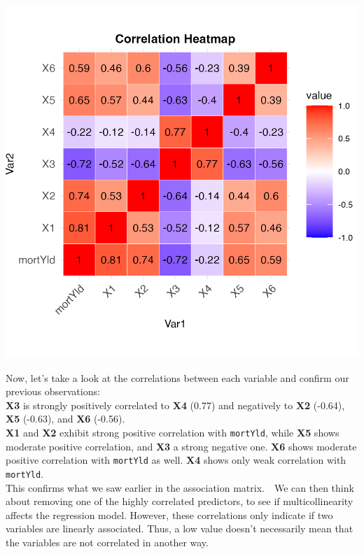 \documentclass[
  11pt,
]{article}
\begin{document}
\begin{minipage}{0.4\textwidth}
\includegraphics[width=\linewidth]{correlation_heatmap.png}
\end{minipage}
\hfill
\begin{minipage}{0.6\textwidth}
\vspace{0.5em}
\small
Now, let's take a look at the correlations between each variable and confirm our previous observations: \\
\textbf{X3} is strongly positively correlated to \textbf{X4} (0.77) and negatively to \textbf{X2} (-0.64), \textbf{X5} (-0.63), and \textbf{X6} (-0.56).\\
\textbf{X1} and \textbf{X2} exhibit strong positive correlation with \texttt{mortYld}, while \textbf{X5} shows moderate positive correlation, and \textbf{X3} a strong negative one. \textbf{X6} shows moderate positive correlation with \texttt{mortYld} as well. \textbf{X4} shows only weak correlation with \texttt{mortYld}.\\
This confirms what we saw earlier in the association matrix.\
\
We can then think about removing one of the highly correlated
predictors, to see if multicollinearity affects the regression model.
However, these correlations only indicate if two variables are linearly
associated. Thus, a low value doesn't necessarily mean that the
variables are not correlated in another way.
\end{minipage}
\end{document}
